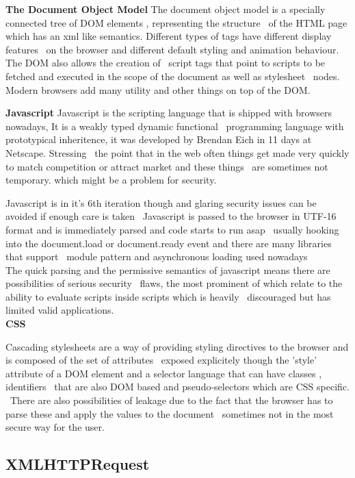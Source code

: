 \textbf{The Document Object Model}
The document object model is a specially connected tree of DOM elements , representing the structure \
of the HTML page which has an xml like semantics. Different types of tags have different display features \
on the browser and different default styling and animation behaviour. The DOM also allows the creation of \
script tags that point to scripts to be fetched and executed in the scope of the document as well as stylesheet \
nodes. Modern browsers add many utility and other things on top of the DOM.

\textbf{Javascript}
Javascript is the scripting language that is shipped with browsers nowadays, It is a weakly typed dynamic functional \
programming language with prototypical inheritence, it was developed by Brendan Eich in 11 days at Netscape. Stressing \
the point that in the web often things get made very quickly to match competition or attract market and these things \
are sometimes not temporary. which might be a problem for security.

Javascript is in it's 6th iteration though and glaring security issues can be avoided if enough care is taken \
Javascript is passed to the browser in UTF-16 format and is immediately parsed and code starts to run asap \ 
usually hooking into the document.load or document.ready event and there are many libraries that support \
module pattern and asynchronous loading used nowadays\\

The quick parsing and the permissive semantics of javascript means there are possibilities of serious security \
flaws, the most prominent of which relate to the ability to evaluate scripts inside scripts which is heavily \
discouraged but has limited valid applications.\\

\textbf{CSS}

Cascading stylesheets are a way of providing styling directives to the browser and is composed of the set of attributes \
exposed explicitely though the 'style' attribute of a DOM element and a selector language that can have classes , identifiers \
that are also DOM based and pseudo-selectors which are CSS specific. \
There are also possibilities of leakage due to the fact that the browser has to parse these and apply the values to the document \
sometimes not in the most secure way for the user.\\

\subsection{XMLHTTPRequest}

